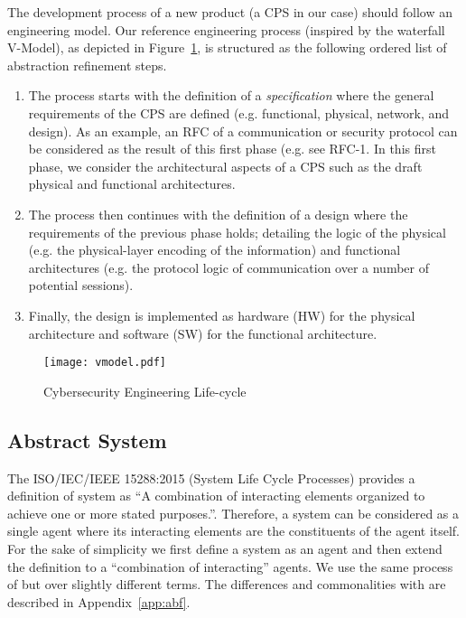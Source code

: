 The development process of a new product (a CPS in our case) 
should follow an engineering model. Our reference engineering process 
(inspired by the waterfall V-Model\autocite{waterfallvmodel}), as depicted in
Figure~\ref{fig:simplifiedvmodel}, is structured as the following ordered list
of abstraction refinement steps.
\begin{enumerate}
	\item The process starts with the definition of a \emph{specification}
		where the general requirements of the CPS are defined (e.g.
		functional, physical, network, and design).  As an example, an
		RFC of a communication or security protocol can be considered
		as the result of this first phase (e.g. see
		RFC-1\autocite{rfc1}.  In this first phase, we consider the
		architectural aspects of a CPS such as the draft physical and
		functional architectures.
	\item The process then continues with the definition of a design where
		the requirements of the previous phase holds; detailing the
		logic of the physical (e.g. the physical-layer encoding of the
		information) and functional architectures (e.g. the protocol
		logic of communication over a number of potential sessions).
	\item Finally, the design is implemented as hardware (HW) for the physical architecture
		and software (SW) for the functional architecture.
\end{enumerate}

\begin{figure}[t]
	\centering
	\texttt{[image: vmodel.pdf]}
	\caption{Cybersecurity Engineering Life-cycle}
	\label{fig:simplifiedvmodel}
\end{figure}

\subsection{Abstract System}\label{sec:systemstate}
The ISO/IEC/IEEE 15288:2015 (System Life Cycle Processes) provides a definition
of system as ``A combination of interacting elements organized to achieve one
or more stated purposes.''\autocite{ISO201515288}.  Therefore, a system can be
considered as a single agent where its interacting elements are the
constituents of the agent itself. For the sake of simplicity we first define a
system as an agent and then extend the definition to a ``combination of
interacting'' agents.  We use the same process of \autocite{Santaca2016abf} but
over slightly different terms. The differences and commonalities with
\autocite{Santaca2016abf} are described in Appendix~\ref{app:abf}. 

